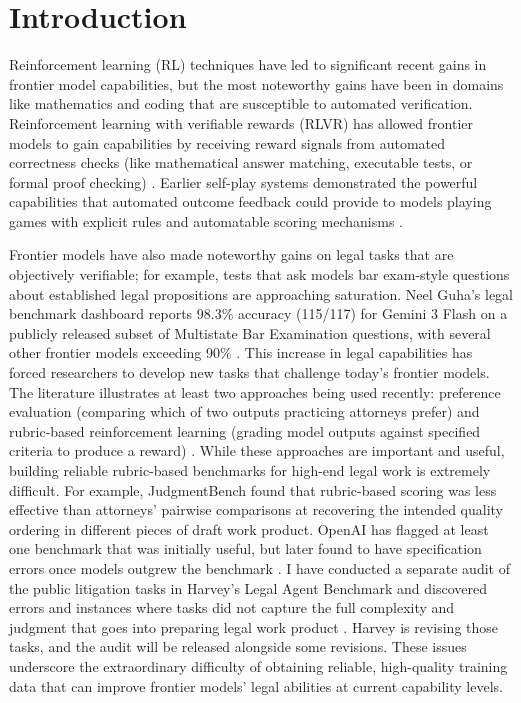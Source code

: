 \documentclass[11pt]{article}
\begin{document}
\section{Introduction}

Reinforcement learning (RL) techniques have led to significant recent gains in frontier model capabilities, but the most noteworthy gains have been in domains like mathematics and coding that are susceptible to automated verification. Reinforcement learning with verifiable rewards (RLVR) has allowed frontier models to gain capabilities by receiving reward signals from automated correctness checks (like mathematical answer matching, executable tests, or formal proof checking) \citep{deepseek,rlve}. Earlier self-play systems demonstrated the powerful capabilities that automated outcome feedback could provide to models playing games with explicit rules and automatable scoring mechanisms \citep{alphazero}.

Frontier models have also made noteworthy gains on legal tasks that are objectively verifiable; for example, tests that ask models bar exam-style questions about established legal propositions are approaching saturation. Neel Guha's legal benchmark dashboard reports 98.3\% accuracy (115/117) for Gemini 3 Flash on a publicly released subset of Multistate Bar Examination questions, with several other frontier models exceeding 90\% \citep{legalEval}. This increase in legal capabilities has forced researchers to develop new tasks that challenge today's frontier models. The literature illustrates at least two approaches being used recently: preference evaluation (comparing which of two outputs practicing attorneys prefer) and rubric-based reinforcement learning (grading model outputs against specified criteria to produce a reward) \citep{judgmentbench}. While these approaches are important and useful, building reliable rubric-based benchmarks for high-end legal work is extremely difficult. For example, JudgmentBench found that rubric-based scoring was less effective than attorneys' pairwise comparisons at recovering the intended quality ordering in different pieces of draft work product. OpenAI has flagged at least one benchmark that was initially useful, but later found to have specification errors once models outgrew the benchmark \citep{swecritique}. I have conducted a separate audit of the public litigation tasks in Harvey's Legal Agent Benchmark and discovered errors and instances where tasks did not capture the full complexity and judgment that goes into preparing legal work product \citep{labauditpaper}. Harvey is revising those tasks, and the audit will be released alongside some revisions. These issues underscore the extraordinary difficulty of obtaining reliable, high-quality training data that can improve frontier models' legal abilities at current capability levels.
\end{document}
